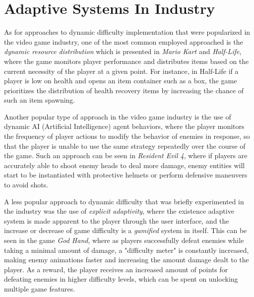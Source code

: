 
\section{Adaptive Systems In Industry}

As for approaches to dynamic difficulty implementation that were popularized in the video game industry, one of the most common employed approached is the \emph{dynamic resource distribution} which is presented in \emph{Mario Kart} and \emph{Half-Life}, where the game monitors player performance and distributes items based on the current necessity of the player at a given point. For instance, in Half-Life if a player is low on health and opens an item container such as a box, the game prioritizes the distribution of health recovery items by increasing the chance of such an item spawning.

Another popular type of approach in the video game industry is the use of dynamic AI (Artificial Intelligence) agent behaviors, where the player monitors the frequency of player actions to modify the behavior of enemies in response, so that the player is unable to use the same strategy repeatedly over the course of the game. Such an approach can be seen in \emph{Resident Evil 4}, where if players are accurately able to shoot enemy heads to deal more damage, enemy entities will start to be instantiated with protective helmets or perform defensive maneuvers to avoid shots.

A less popular approach to dynamic difficulty that was briefly experimented in the industry was the use of \emph{explicit adaptivity}, where the existence adaptive system is made apparent to the player through the user interface, and the increase or decrease of game difficulty is a \emph{gamified} system in itself. This can be seen in the game \emph{God Hand}, where as players successfully defeat enemies while taking a minimal amount of damage, a "difficulty meter" is constantly increased, making enemy animations faster and increasing the amount damage dealt to the player. As a reward, the player receives an increased amount of points for defeating enemies in higher difficulty levels, which can be spent on unlocking multiple game features. 

